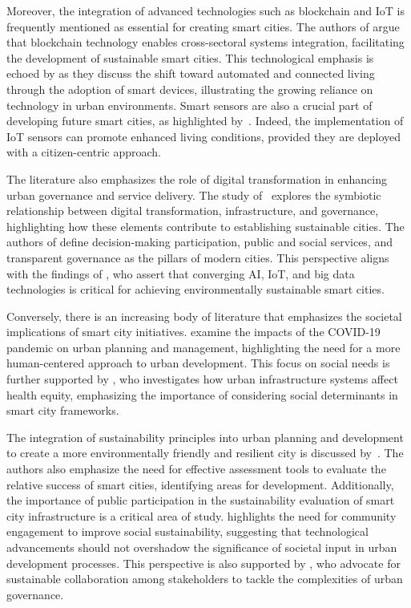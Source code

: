 \documentclass[smartcities,article,submit,pdftex,moreauthors]{Definitions/mdpi}
\begin{document}
Moreover, the integration of advanced technologies such as blockchain and IoT is frequently mentioned as essential for creating smart cities. The authors of \cite{khawajaBlockchainSustainable2023} argue that blockchain technology enables cross-sectoral systems integration, facilitating the development of sustainable smart cities. This technological emphasis is echoed by \cite{ferrariSmartSolutionNeighbourhood2023} as they discuss the shift toward automated and connected living through the adoption of smart devices, illustrating the growing reliance on technology in urban environments. Smart sensors are also a crucial part of developing future smart cities, as highlighted by~\cite{zengSensorsInternetThings2024}. Indeed, the implementation of IoT sensors can promote enhanced living conditions, provided they are deployed with a citizen-centric approach.

The literature also emphasizes the role of digital transformation in enhancing urban governance and service delivery. The study of~\cite{dasDigitalTransformationGovernance2024} explores the symbiotic relationship between digital transformation, infrastructure, and governance, highlighting how these elements contribute to establishing sustainable cities. The authors of \cite{singhDecadeReviewSmart2022} define decision-making participation, public and social services, and transparent governance as the pillars of modern cities. This perspective aligns with the findings of \cite{bibriSustainableCitiesTechnologies2023}, who assert that converging AI, IoT, and big data technologies is critical for achieving environmentally sustainable smart cities.  

Conversely, there is an increasing body of literature that emphasizes the societal implications of smart city initiatives. \cite{sharifiPandemicsUrbanPlan2020} examine the impacts of the COVID-19 pandemic on urban planning and management, highlighting the need for a more human-centered approach to urban development. This focus on social needs is further supported by \cite{moumenHumanTechnologyBalancing2024}, who investigates how urban infrastructure systems affect health equity, emphasizing the importance of considering social determinants in smart city frameworks.  

The integration of sustainability principles into urban planning and development to create a more environmentally friendly and resilient city is discussed by~\cite{Kusumastuti2021,Batra2022}. The authors also emphasize the need for effective assessment tools to evaluate the relative success of smart cities, identifying areas for development. Additionally, the importance of public participation in the sustainability evaluation of smart city infrastructure is a critical area of study. \cite{moumenHumanTechnologyBalancing2024} highlights the need for community engagement to improve social sustainability, suggesting that technological advancements should not overshadow the significance of societal input in urban development processes. This perspective is also supported by \cite{millsSmartCityCollaboration2021}, who advocate for sustainable collaboration among stakeholders to tackle the complexities of urban governance.  
\end{document}
